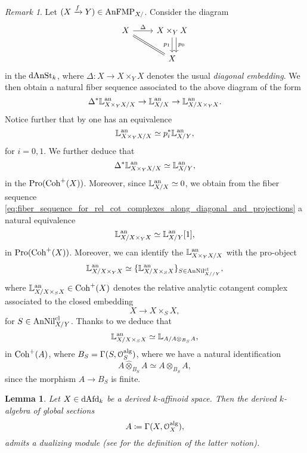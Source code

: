 \documentclass[10pt,a4paper,reqno]{amsart} %
\theoremstyle{plain}
\newtheorem{lem}[thm]{Lemma}
\theoremstyle{definition}
\theoremstyle{remark}
\newtheorem{rem}[thm]{Remark}
\numberwithin{equation}{section}
\begin{document}
\begin{rem} Let $(X \xrightarrow{f} Y) \in \mathrm{AnFMP}_{X/ }$.
Consider the diagram
    \[
    \begin{tikzcd}
        X \ar{r}{\Delta}  \ar[rd, equal] & X \times_Y X \arrow[d, "p_0", shift left=2] \arrow{d}[swap]{p_1} \\
        &   X  
    \end{tikzcd}
    \]
in the \infcat $\mathrm{dAnSt}_k$, where $\Delta \colon X \to X \times_Y X$ denotes the usual \emph{diagonal embedding}. We then obtain a natural
fiber sequence associated to the above diagram of the form
    \begin{equation} \label{eq:fiber_sequence_for_rel_cot_complexes_along_diagonal_and_projections}
        \Delta^* \mathbb L^\mathrm{an}_{X \times_Y X/ X} \to \mathbb L^\mathrm{an}_{X/X} \to \mathbb L^\mathrm{an}_{X/ X \times_Y X}.
    \end{equation}
Notice further that by \cite[Proposition 5.12]{Porta_Yu_Representability} one has an equivalence
    \[
        \mathbb L^\mathrm{an}_{X \times_Y X/ X} \simeq p_i^* \mathbb L^\mathrm{an}_{X/Y},  
    \]
for $i =0, 1$. We further deduce that
    \[\Delta^* \mathbb L^\mathrm{an}_{X \times_Y X/ X} \simeq \mathbb L^\mathrm{an}_{X/Y},\]
in the \infcat $\mathrm{Pro}(\mathrm{Coh}^+(X))$. Moreover, since $\mathbb L^\mathrm{an}_{X/ X} \simeq 0$, we obtain from the fiber sequence \eqref{eq:fiber_sequence_for_rel_cot_complexes_along_diagonal_and_projections}
a natural equivalence
    \[
        \mathbb L^\mathrm{an}_{X/ X \times_Y X} \simeq \mathbb L^\mathrm{an}_{X / Y} [1],    
    \]
in $\mathrm{Pro}(\mathrm{Coh}^+(X))$. Moreover, we can identify the $\mathbb L^\mathrm{an}_{X \times_Y X / X}$ with the pro-object  
    \[
        \mathbb L^\mathrm{an}_{X/ X \times_Y X } \simeq \{ \mathbb L^\mathrm{an}_{X/ X \times_S X} \}_{S \in \mathrm{AnNil}_{X//Y}^{\mathrm{cl}}} ,
    \]
where $\mathbb L^\mathrm{an}_{X/ X\times_S X} \in \mathrm{Coh}^+(X)$ denotes the relative analytic cotangent complex associated to the closed embedding
    \[
        X \to X \times_S X,  
    \]
for $S \in \mathrm{AnNil}_{X/Y}^{\mathrm{cl}}$. Thanks to \cite[Corollary 5.33]{Porta_Yu_Representability} we deduce that
    \[
        \mathbb L^\mathrm{an}_{X/X\times_SX} \simeq \mathbb L_{A/ A \otimes_{B_S} A} ,
    \]
in $\mathrm{Coh}^+(A)$, where $B_S = \Gamma(S, \mathcal O^\mathrm{alg}_S)$, where we have a natural identification
    \[
        A \widehat{\otimes}_{B_S} A \simeq A \otimes_{B_S} A,
    \]
since the morphism $A \to B_S$ is finite.
\end{rem}

\begin{lem}
    Let $X \in \mathrm{dAfd}_k$ be a derived $k$-affinoid space. Then the derived $k$-algebra of global sections
        \[
            A \coloneqq \Gamma(X, \mathcal O_X^\mathrm{alg}),  
        \]
    admits a dualizing module (see \cite[Definition 4.2.5]{DAG-XIV} for the definition of the latter notion).
\end{lem}
\end{document}
